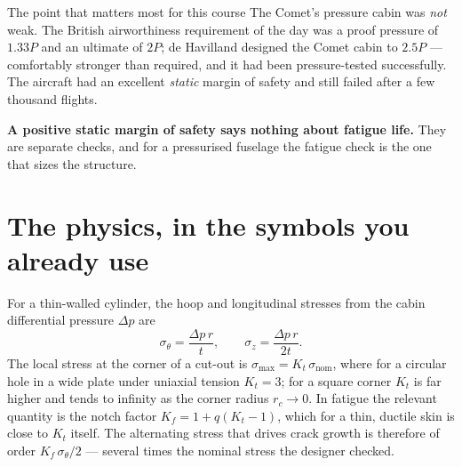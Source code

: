 \documentclass[11pt,a4paper]{article}
\begin{document}
\begin{aerobox}{The point that matters most for this course}
The Comet's pressure cabin was \emph{not} weak. The British airworthiness requirement of the day was a proof pressure of $1.33P$ and an ultimate of $2P$; de Havilland designed the Comet cabin to $2.5P$ --- comfortably stronger than required, and it had been pressure-tested successfully. The aircraft had an excellent \emph{static} margin of safety and still failed after a few thousand flights.

\medskip
\textbf{A positive static margin of safety says nothing about fatigue life.} They are separate checks, and for a pressurised fuselage the fatigue check is the one that sizes the structure.
\end{aerobox}

\section{The physics, in the symbols you already use}

For a thin-walled cylinder, the hoop and longitudinal stresses from the cabin differential pressure $\Delta p$ are
\[
\sigma_\theta=\frac{\Delta p\,r}{t},\qquad \sigma_z=\frac{\Delta p\,r}{2t}.
\]
The local stress at the corner of a cut-out is $\sigma_{\max}=K_t\,\sigma_{\text{nom}}$, where for a circular hole in a wide plate under uniaxial tension $K_t=3$; for a square corner $K_t$ is far higher and tends to infinity as the corner radius $r_c\to 0$. In fatigue the relevant quantity is the notch factor $K_f=1+q(K_t-1)$, which for a thin, ductile skin is close to $K_t$ itself. The alternating stress that drives crack growth is therefore of order $K_f\,\sigma_\theta/2$ --- several times the nominal stress the designer checked.
\end{document}
